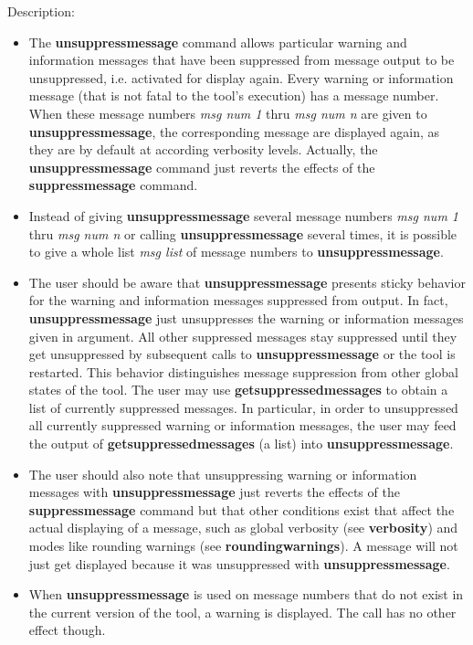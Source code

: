 \noindent Description: \begin{itemize}

\item The \textbf{unsuppressmessage} command allows particular warning and information
   messages that have been suppressed from message output to be
   unsuppressed, i.e. activated for display again. Every \sollya warning
   or information message (that is not fatal to the tool's execution) has
   a message number. When these message numbers \emph{msg num 1} thru \emph{msg num n} 
   are given to \textbf{unsuppressmessage}, the corresponding message are displayed
   again, as they are by default at according verbosity levels. Actually,
   the \textbf{unsuppressmessage} command just reverts the effects of the \textbf{suppressmessage}
   command.

\item Instead of giving \textbf{unsuppressmessage} several message numbers \emph{msg num 1} thru
   \emph{msg num n} or calling \textbf{unsuppressmessage} several times, it is possible to give
   a whole list \emph{msg list} of message numbers to \textbf{unsuppressmessage}.

\item The user should be aware that \textbf{unsuppressmessage} presents sticky behavior for
   the warning and information messages suppressed from output.  In fact,
   \textbf{unsuppressmessage} just unsuppresses the warning or information messages given
   in argument.  All other suppressed messages stay suppressed until they
   get unsuppressed by subsequent calls to \textbf{unsuppressmessage} or the \sollya tool
   is restarted. This behavior distinguishes message suppression from
   other global states of the \sollya tool. The user may use
   \textbf{getsuppressedmessages} to obtain a list of currently suppressed
   messages. In particular, in order to unsuppressed all currently
   suppressed warning or information messages, the user may feed the
   output of \textbf{getsuppressedmessages} (a list) into \textbf{unsuppressmessage}.

\item The user should also note that unsuppressing warning or information
   messages with \textbf{unsuppressmessage} just reverts the effects of the \textbf{suppressmessage}
   command but that other conditions exist that affect the actual displaying 
   of a message, such as global verbosity (see \textbf{verbosity}) and modes
   like rounding warnings (see \textbf{roundingwarnings}). A message will not just 
   get displayed because it was unsuppressed with \textbf{unsuppressmessage}.

\item When \textbf{unsuppressmessage} is used on message numbers that do not exist in the
   current version of the tool, a warning is displayed. The call has no
   other effect though.
\end{itemize}
